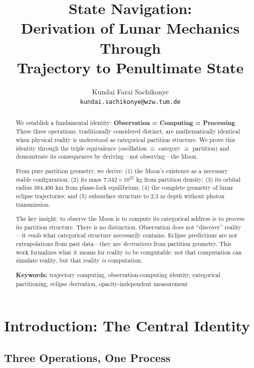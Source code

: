 \documentclass[twocolumn,10pt]{article}
\title{State Navigation: \\[0.5em]
\Large Derivation of Lunar Mechanics Through\\[0.3em]
\large Trajectory to Penultimate State}
\author{
Kundai Farai Sachikonye\\
\texttt{kundai.sachikonye@wzw.tum.de}
}
\theoremstyle{definition}
\theoremstyle{remark}
\begin{document}
\maketitle

\begin{abstract}
We establish a fundamental identity: \textbf{Observation = Computing = Processing}. These three operations, traditionally considered distinct, are mathematically identical when physical reality is understood as categorical partition structure. We prove this identity through the triple equivalence (oscillation $\equiv$ category $\equiv$ partition) and demonstrate its consequences by deriving---not observing---the Moon.

From pure partition geometry, we derive: (1) the Moon's existence as a necessary stable configuration; (2) its mass $7.342 \times 10^{22}$ kg from partition density; (3) its orbital radius 384,400 km from phase-lock equilibrium; (4) the complete geometry of lunar eclipse trajectories; and (5) subsurface structure to 2.3 m depth without photon transmission.

The key insight: to observe the Moon is to compute its categorical address is to process its partition structure. There is no distinction. Observation does not ``discover'' reality---it \emph{reads} what categorical structure necessarily contains. Eclipse predictions are not extrapolations from past data---they are \emph{derivations} from partition geometry. This work formalizes what it means for reality to be computable: not that computation can simulate reality, but that reality \emph{is} computation.

\textbf{Keywords:} trajectory computing, observation-computing identity, categorical partitioning, eclipse derivation, opacity-independent measurement
\end{abstract}


\section{Introduction: The Central Identity}
\label{sec:introduction}

\subsection{Three Operations, One Process}
\end{document}
